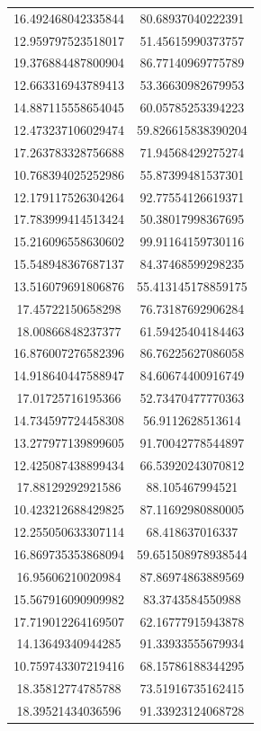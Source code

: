 \begin{table}
\begin{tabular}{cc}
16.492468042335844 & 80.68937040222391 \\
12.959797523518017 & 51.45615990373757 \\
19.376884487800904 & 86.77140969775789 \\
12.663316943789413 & 53.36630982679953 \\
14.887115558654045 & 60.05785253394223 \\
12.473237106029474 & 59.826615838390204 \\
17.263783328756688 & 71.94568429275274 \\
10.768394025252986 & 55.87399481537301 \\
12.179117526304264 & 92.77554126619371 \\
17.783999414513424 & 50.38017998367695 \\
15.216096558630602 & 99.91164159730116 \\
15.548948367687137 & 84.37468599298235 \\
13.516079691806876 & 55.413145178859175 \\
17.45722150658298 & 76.73187692906284 \\
18.00866848237377 & 61.59425404184463 \\
16.876007276582396 & 86.76225627086058 \\
14.918640447588947 & 84.60674400916749 \\
17.01725716195366 & 52.73470477770363 \\
14.734597724458308 & 56.9112628513614 \\
13.277977139899605 & 91.70042778544897 \\
12.425087438899434 & 66.53920243070812 \\
17.88129292921586 & 88.105467994521 \\
10.423212688429825 & 87.11692980880005 \\
12.255050633307114 & 68.418637016337 \\
16.869735353868094 & 59.651508978938544 \\
16.95606210020984 & 87.86974863889569 \\
15.567916090909982 & 83.3743584550988 \\
17.719012264169507 & 62.16777915943878 \\
14.13649340944285 & 91.33933555679934 \\
10.759743307219416 & 68.15786188344295 \\
18.35812774785788 & 73.51916735162415 \\
18.39521434036596 & 91.33923124068728 \\

\end{tabular}
\end{table}
